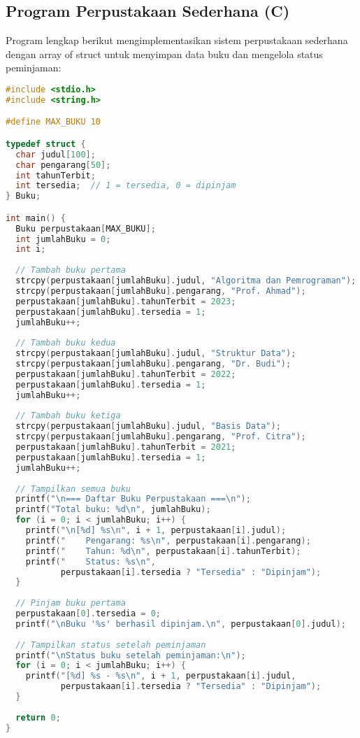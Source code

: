 \documentclass[../main.tex]{subfiles}
\begin{document}
\subsection{Program Perpustakaan Sederhana (C)}

Program lengkap berikut mengimplementasikan sistem perpustakaan sederhana dengan array of struct untuk menyimpan data buku dan mengelola status peminjaman:

\begin{lstlisting}[language=C, caption={Program perpustakaan sederhana di C}]
#include <stdio.h>
#include <string.h>

#define MAX_BUKU 10

typedef struct {
  char judul[100];
  char pengarang[50];
  int tahunTerbit;
  int tersedia;  // 1 = tersedia, 0 = dipinjam
} Buku;

int main() {
  Buku perpustakaan[MAX_BUKU];
  int jumlahBuku = 0;
  int i;
  
  // Tambah buku pertama
  strcpy(perpustakaan[jumlahBuku].judul, "Algoritma dan Pemrograman");
  strcpy(perpustakaan[jumlahBuku].pengarang, "Prof. Ahmad");
  perpustakaan[jumlahBuku].tahunTerbit = 2023;
  perpustakaan[jumlahBuku].tersedia = 1;
  jumlahBuku++;
  
  // Tambah buku kedua
  strcpy(perpustakaan[jumlahBuku].judul, "Struktur Data");
  strcpy(perpustakaan[jumlahBuku].pengarang, "Dr. Budi");
  perpustakaan[jumlahBuku].tahunTerbit = 2022;
  perpustakaan[jumlahBuku].tersedia = 1;
  jumlahBuku++;
  
  // Tambah buku ketiga
  strcpy(perpustakaan[jumlahBuku].judul, "Basis Data");
  strcpy(perpustakaan[jumlahBuku].pengarang, "Prof. Citra");
  perpustakaan[jumlahBuku].tahunTerbit = 2021;
  perpustakaan[jumlahBuku].tersedia = 1;
  jumlahBuku++;
  
  // Tampilkan semua buku
  printf("\n=== Daftar Buku Perpustakaan ===\n");
  printf("Total buku: %d\n", jumlahBuku);
  for (i = 0; i < jumlahBuku; i++) {
    printf("\n[%d] %s\n", i + 1, perpustakaan[i].judul);
    printf("    Pengarang: %s\n", perpustakaan[i].pengarang);
    printf("    Tahun: %d\n", perpustakaan[i].tahunTerbit);
    printf("    Status: %s\n", 
           perpustakaan[i].tersedia ? "Tersedia" : "Dipinjam");
  }
  
  // Pinjam buku pertama
  perpustakaan[0].tersedia = 0;
  printf("\nBuku '%s' berhasil dipinjam.\n", perpustakaan[0].judul);
  
  // Tampilkan status setelah peminjaman
  printf("\nStatus buku setelah peminjaman:\n");
  for (i = 0; i < jumlahBuku; i++) {
    printf("[%d] %s - %s\n", i + 1, perpustakaan[i].judul,
           perpustakaan[i].tersedia ? "Tersedia" : "Dipinjam");
  }
  
  return 0;
}
\end{lstlisting}
\end{document}
